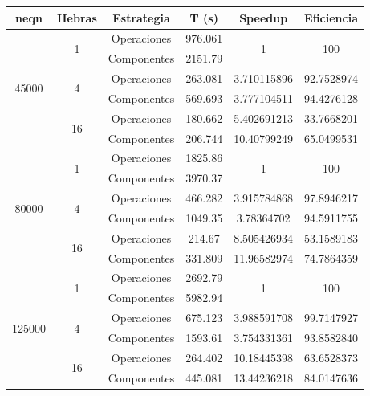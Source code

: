 \begin{table}[H]
	\begin{center}
		\begin{tabular}{| c | c | c | c | c | c |}
			\hline
			\textbf{neqn} & \textbf{Hebras} & \textbf{Estrategia} & \textbf{T (s)} & \textbf{Speedup} & \textbf{Eficiencia} \\
			\hline
			
			\multirow{6}{*}{45000}
			& \multirow{2}{*}{1}  & Operaciones & 976.061 & \multirow{2}{*}{1} & \multirow{2}{*}{100} \\
			\cline{3-4}
			&                     & Componentes & 2151.79 &                   &                    \\
			\cline{2-6}
			& \multirow{2}{*}{4}  & Operaciones & 263.081 & 3.710115896 & 92.7528974 \\
			\cline{3-6}
			&                     & Componentes & 569.693 & 3.777104511 & 94.4276128 \\
			\cline{2-6}
			& \multirow{2}{*}{16} & Operaciones & 180.662 & 5.402691213 & 33.7668201 \\
			\cline{3-6}
			&                     & Componentes & 206.744 & 10.40799249 & 65.0499531 \\
			\hline
			
			\multirow{6}{*}{80000}
			& \multirow{2}{*}{1}  & Operaciones & 1825.86 & \multirow{2}{*}{1} & \multirow{2}{*}{100} \\
			\cline{3-4}
			&                     & Componentes & 3970.37 &                   &                    \\
			\cline{2-6}
			& \multirow{2}{*}{4}  & Operaciones & 466.282 & 3.915784868 & 97.8946217 \\
			\cline{3-6}
			&                     & Componentes & 1049.35 & 3.78364702 & 94.5911755 \\
			\cline{2-6}
			& \multirow{2}{*}{16} & Operaciones & 214.67 & 8.505426934 & 53.1589183 \\
			\cline{3-6}
			&                     & Componentes & 331.809 & 11.96582974 & 74.7864359 \\
			\hline
			
			\multirow{6}{*}{125000}
			& \multirow{2}{*}{1}  & Operaciones & 2692.79 & \multirow{2}{*}{1} & \multirow{2}{*}{100} \\
			\cline{3-4}
			&                     & Componentes & 5982.94 &                   &                    \\
			\cline{2-6}
			& \multirow{2}{*}{4}  & Operaciones & 675.123 & 3.988591708 & 99.7147927 \\
			\cline{3-6}
			&                     & Componentes & 1593.61 & 3.754331361 & 93.8582840 \\
			\cline{2-6}
			& \multirow{2}{*}{16} & Operaciones & 264.402 & 10.18445398 & 63.6528373 \\
			\cline{3-6}
			&                     & Componentes & 445.081 & 13.44236218 & 84.0147636 \\
			\hline
			

\end{tabular}
\end{center}
\end{table}
